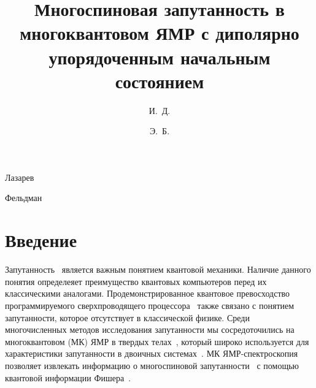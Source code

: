 \documentclass[utf8]{jetp}
\begin{document}
\title{Многоспиновая запутанность в многоквантовом ЯМР с диполярно упорядоченным начальным состоянием}

\author{И.~Д.}{Лазарев}

\author{Э.~Б.}{Фельдман}




\maketitle

\section{Введение}
\label{sec:1}

Запутанность~\cite{Nielsen_2009} является важным понятием квантовой механики. Наличие данного понятия определеяет преимущество квантовых компьютеров перед их классическими аналогами. 
Продемонстрированное квантовое превосходство программируемого сверхпроводящего процессора~\cite{Arute2019} также связано с понятием запутанности, которое отсутствует в классической физике.
Среди многочисленных методов исследования запутанности мы сосредоточились на многоквантовом (МК) ЯМР в твердых телах~\cite{Baum_1985}, который широко используется для характеристики запутанности в двоичных системах~\cite{Furman_2008, Furman_2009, Fel_dman_2008, Fel_dman_2012}.
МК ЯМР-спектроскопия~\cite{Baum_1985} позволяет извлекать информацию о многоспиновой запутанности~\cite{G_rttner_2018} с помощью квантовой информации Фишера~\cite{T_th_2014, Pezz__2018}.
\end{document}
